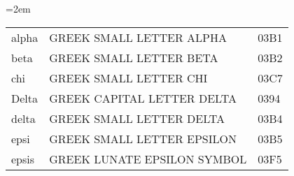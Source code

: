 \documentclass{article}
\begin{document}
{\tabcolsep=2em\relax
\begin{mpsupertabular*}{\textwidth}{lll}
alpha  & GREEK SMALL LETTER ALPHA      & 03B1\\
beta   & GREEK SMALL LETTER BETA       & 03B2\\
chi    & GREEK SMALL LETTER CHI        & 03C7\\
Delta  & GREEK CAPITAL LETTER DELTA    & 0394\\
delta  & GREEK SMALL LETTER DELTA      & 03B4\\
epsi   & GREEK SMALL LETTER EPSILON    & 03B5\\
epsis  & GREEK LUNATE EPSILON SYMBOL   & 03F5\\
\end{mpsupertabular*}
}
\end{document}
